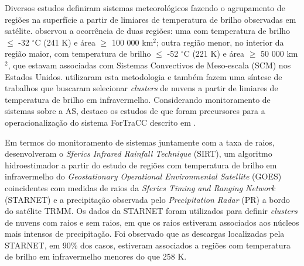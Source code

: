 Diversos estudos definiram sistemas meteorológicos fazendo o agrupamento de regiões na superfície a partir de limiares de temperatura de brilho observadas em satélite.  observou a ocorrência de duas regiões: uma com temperatura de brilho $\leqslant$ -32 $^{\circ}$C (241 K) e área $\geqslant$ {100 000} km$^2$;  outra região menor, no interior da região maior, com temperatura de brilho $\leqslant$ -52 $^{\circ}$C (221 K) e área $\geqslant$ {50 000} km$^2$, que estavam associadas com Sistemas Convectivos de Meso-escala (SCM) nos Estados Unidos.   utilizaram esta metodologia e também fazem uma síntese de trabalhos que buscaram selecionar \textit{clusters} de nuvens a partir de limiares de temperatura de brilho em infravermelho. Considerando monitoramento de sistemas sobre a AS, destaco os estudos de  que foram precursores para a operacionalização do sistema ForTraCC descrito em .


Em termos do monitoramento de sistemas juntamente com a taxa de raios,  desenvolveram o \textit{Sferics
Infrared Rainfall Technique} (SIRT), 
um algoritmo hidroestimador a partir do estudo de regiões com temperatura de brilho em infravermelho do \textit{Geostationary Operational Environmental Satellite} (GOES) coincidentes com medidas de raios da \textit{Sferics Timing and Ranging Network} (STARNET) e a precipitação observada pelo \textit{Precipitation Radar} (PR)  a bordo do satélite TRMM. Os dados da STARNET foram utilizados para definir \textit{clusters} de nuvens com raios e sem raios, em que os raios estiveram associados aos núcleos mais intensos de precipitação. Foi observado que as descargas localizadas pela STARNET, em 90\% dos casos, estiveram associados a regiões com temperatura de brilho em infravermelho menores do que 258 K.




